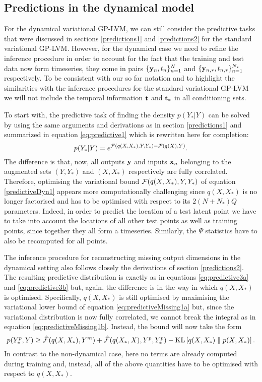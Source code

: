 \subsection{\label{predictionsDynamical} Predictions in the dynamical model}


For the dynamical variational GP-LVM, 
we can still consider the predictive tasks that were discussed in sections \ref{predictions1} and \ref{predictions2}
for the standard variational GP-LVM. However, for the dynamical case we need to refine
the inference procedure in order to account for the fact that the training
and test data now form timeseries, \ie they come in pairs $\{\mathbf{y}_n, t_n\}_{n=1}^N$ and
$\{\mathbf{y}_{n,*}, t_{n,*}\}_{n=1}^{N_*}$ respectively.
To be consistent with our so far notation and to highlight the similarities with the
inference procedures for the standard variational GP-LVM we will not include the temporal
information $\mathbf{t}$ and $\mathbf{t}_*$ in all conditioning sets.

To start with, the predictive task of finding the density $p(Y_*|Y)$ can be solved by using the same arguments
and derivations as in section \ref{predictions1} and summarized in equation \eqref{eq:predictive1}
which is rewritten here for completion:
\begin{equation}
p(Y_* |Y) = e^{ \mathcal{F}(q(X,X_*),Y,Y_*) - \mathcal{F}(q(X),Y)  }. 
\label{eq:predictiveDyn1}
\end{equation}
 The difference
is that, now, all outputs $\mathbf{y}$ and inputs $\mathbf{x}_n$ belonging to the augmented sets
$(Y,Y_*)$ and $(X,X_*)$ respectively are fully correlated. Therefore, optimising the
variational bound $\mathcal{F}(q(X,X_*),Y,Y_*)$ of equation \eqref{predictiveDyn1} appears
more computationally challenging since $q(X,X_*)$ is no longer factorised and has to
be optimised with respect to its $2(N+N_*)Q$ parameters. Indeed, in order to predict
the location of a test latent point we have to take into account the locations of all other
test points as well as training points, since together they all form a timeseries.
Similarly, the $\Psi$ statistics have to also be recomputed for all points.


The inference procedure for reconstructing missing output dimensions in the dynamical setting
also follows closely the derivations of section \ref{predictions2}.
The resulting predictive distribution is exactly as in equations \eqref{eq:predictive3a} and \eqref{eq:predictive3b}
but, again, the difference is in the way in which $q(X,X_*)$ is optimised. Specifically,
$q(X,X_*)$ is still optimised by maximising the variational lower bound of equation \eqref{eq:predictiveMissing1a}
but, since the variational distribution is now fully correlated, we cannot break the integral as in
equation \eqref{eq:predictiveMissing1b}. Instead, the bound will now take the form
\begin{equation}
 \label{eq:predictiveDyn2}
 p(Y_*^p,Y) \geq \hat{\mathcal{F}}(q(X,X_*), Y^m) + \hat{\mathcal{F}}(q(X_*,X), Y^p, Y_*^p)
	- \text{KL} \left[ q(X,X_*) \parallel p(X,X_*) \right] .
\end{equation}
In contrast to the non-dynamical case, here no terms are already computed during training and, instead,
all of the above quantities have to be optimised with respect to $q(X,X_*)$.


